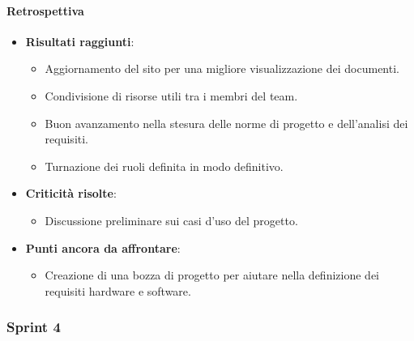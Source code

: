 \documentclass{article}
\begin{document}
                \paragraph{Retrospettiva}
                \begin{itemize}
                    \item \textbf{Risultati raggiunti}:
                        \begin{itemize}
                            \item Aggiornamento del sito per una migliore visualizzazione dei documenti.
                            \item Condivisione di risorse utili tra i membri del team.
                            \item Buon avanzamento nella stesura delle norme di progetto e dell'analisi dei requisiti.
                            \item Turnazione dei ruoli definita in modo definitivo.
                        \end{itemize}
                    \item \textbf{Criticità risolte}:
                        \begin{itemize}
                            \item Discussione preliminare sui casi d'uso del progetto.
                        \end{itemize}
                    \item \textbf{Punti ancora da affrontare}:
                        \begin{itemize}
                            \item Creazione di una bozza di progetto per aiutare nella definizione dei requisiti hardware e software.
                        \end{itemize}
                \end{itemize}
            \subsubsection{Sprint 4}
\end{document}
